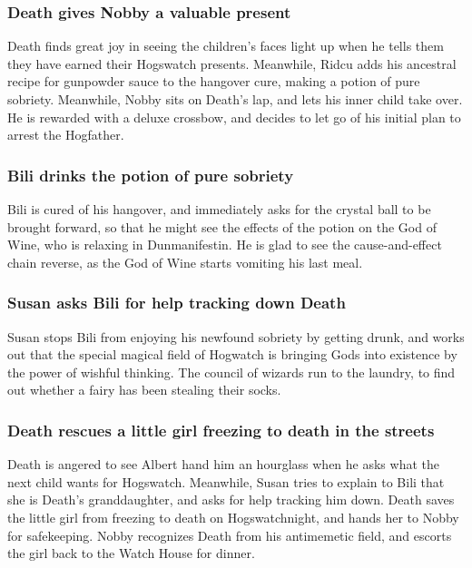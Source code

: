 \subsubsection{\Gls{Death} gives \Gls{Nobby} a valuable present}
\Gls{Death} finds great joy in seeing the children's faces light up when he tells them they have
earned their Hogswatch presents. Meanwhile, \Gls{Ridcu} adds his ancestral recipe for gunpowder
sauce to the hangover cure, making a potion of pure sobriety. Meanwhile, \Gls{Nobby} sits on
\Gls{Death}'s lap, and lets his inner child take over. He is rewarded with a deluxe crossbow, and
decides to let go of his initial plan to arrest the Hogfather.

\subsubsection{\Gls{Bili} drinks the potion of pure sobriety}
\Gls{Bili} is cured of his hangover, and immediately asks for the crystal ball to be brought
forward, so that he might see the effects of the potion on the God of Wine, who is relaxing in
Dunmanifestin. He is glad to see the cause-and-effect chain reverse, as the God of Wine starts
vomiting his last meal.

\subsubsection{\Gls{Susan} asks \Gls{Bili} for help tracking down \Gls{Death}}
\Gls{Susan} stops \Gls{Bili} from enjoying his newfound sobriety by getting drunk, and works out
that the special magical field of Hogwatch is bringing Gods into existence by the power of wishful
thinking. The council of wizards run to the laundry, to find out whether a fairy has been stealing
their socks.

\subsubsection{\Gls{Death} rescues a little girl freezing to death in the streets}
\Gls{Death} is angered to see \Gls{Albert} hand him an hourglass when he asks what the next child
wants for Hogswatch. Meanwhile, \Gls{Susan} tries to explain to \Gls{Bili} that she is \Gls{Death}'s
granddaughter, and asks for help tracking him down. \Gls{Death} saves the little girl from freezing
to death on Hogswatchnight, and hands her to \Gls{Nobby} for safekeeping. \Gls{Nobby} recognizes
\Gls{Death} from his antimemetic field, and escorts the girl back to the Watch House for dinner.


